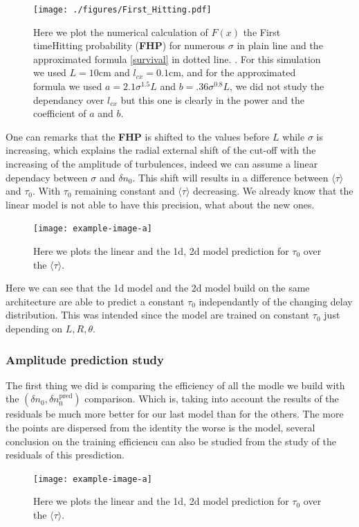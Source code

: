 \documentclass[11pt,a4paper,openany]{report}
\begin{document}
\begin{multicols}{2}
    \begin{figure}[H]
        \centering
        \texttt{[image: ./figures/First\_Hitting.pdf]}
        \label{FHP}
        \caption{Here we plot the numerical calculation of $F(x)$ the First timeHitting probability (\textbf{FHP}) for numerous $\sigma$ in plain line  and the approximated formula \eqref{survival} in dotted line. . For this simulation we used $L = 10$cm and $l_{cx} = 0.1$cm, and for the approximated formula we used $a = 2.1 \sigma^{1.5}L$ and $b = .36\sigma^{0.8} L$, we did not study the dependancy over $l_{cx}$ but this one is clearly in the power and the coefficient of $a$ and $b$.}
    \end{figure}
    One can remarks that the \textbf{FHP} is shifted to the values before $L$ while $\sigma $ is increasing, which explains the radial external shift of the cut-off with the increasing of the amplitude of turbulences, indeed we can assume a linear dependacy between $\sigma$ and $\delta n_0$. This shift will results in a difference between $\langle \tau \rangle$ and $\tau_0$. With $\tau_0$ remaining constant and $\langle \tau \rangle$ decreasing. We already know that the linear model is not able to have this precision, what about the new ones.
    \begin{figure}[H]
        \centering
        \texttt{[image: example-image-a]}
        \label{}
        \caption{Here we plots the linear and the 1d, 2d model prediction for $\tau_0$ over the $\langle \tau \rangle$.}
    \end{figure}
    Here we can see that the 1d model and the 2d model build on the same architecture are able to predict a constant $\tau_0$ independantly of the changing delay distribution. This was intended since the model are trained on constant $\tau_0$ just depending on $L, R, \theta$.
    \subsubsection{Amplitude prediction study}
    The first thing we did is comparing the efficiency of all the modle we build with the $(\delta n_0, \delta n_0^{\text{pred}})$ comparison. Which is, taking into account the results of the residuals be much more better for our last model than for the others. The more the points are dispersed from the identity the worse is the model, several conclusion on the training efficiencu can also be studied from the study of the residuals of this presdiction.

    \begin{figure}[H]
        \centering
        \texttt{[image: example-image-a]}
        \label{}
        \caption{Here we plots the linear and the 1d, 2d model prediction for $\tau_0$ over the $\langle \tau \rangle$.}
    \end{figure}


\end{multicols}
\end{document}
